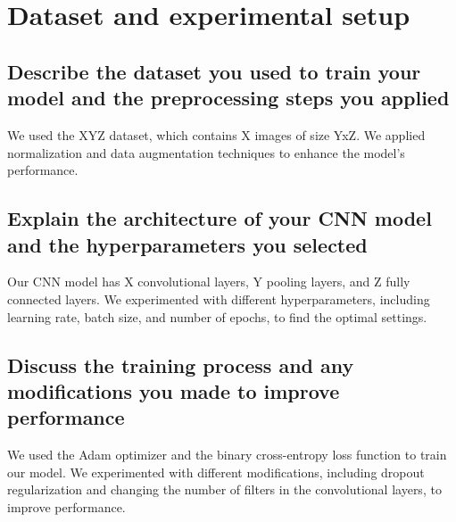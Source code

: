 



\chapter{Dataset and experimental setup}

    \section{Describe the dataset you used to train your model and the preprocessing steps you applied}

        We used the XYZ dataset, which contains X images of size YxZ.
        We applied normalization and data augmentation techniques to enhance the model's performance.

    \section{Explain the architecture of your CNN model and the hyperparameters you selected}

        Our CNN model has X convolutional layers, Y pooling layers, and Z fully connected layers.
        We experimented with different hyperparameters, including learning rate, batch size, and number of epochs, to find the optimal settings.

    \section{Discuss the training process and any modifications you made to improve performance}

        We used the Adam optimizer and the binary cross-entropy loss function to train our model.
        We experimented with different modifications, including dropout regularization and changing the number of filters in the convolutional layers, to improve performance.
